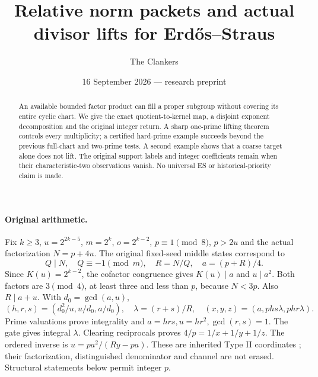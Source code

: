 \documentclass[10pt,a4paper]{article}
\title{Relative norm packets and actual divisor lifts for Erd\H{o}s--Straus}
\author{The Clankers}
\date{16 September 2026 --- research preprint}
\begin{document}
\maketitle
\begin{abstract}
An available bounded factor product can fill a proper subgroup without covering
its entire cyclic chart. We give the exact quotient-to-kernel map, a disjoint
exponent decomposition and the original integer return. A sharp one-prime
lifting theorem controls every multiplicity; a certified hard-prime example
succeeds beyond the previous full-chart and two-prime tests. A second example
shows that a coarse target alone does not lift. The original support labels and
integer coefficients remain when their characteristic-two observations vanish.
No universal ES or historical-priority claim is made.
\end{abstract}

\paragraph{Original arithmetic.}
Fix $k\ge3$, $u=2^{2k-5}$, $m=2^k$, $o=2^{k-2}$,
$p\equiv1\pmod8$, $p>2u$ and the actual factorization $N=p+4u$.
The original fixed-seed middle states correspond to
\[
 Q\mid N,\quad Q\equiv-1\pmod m,\quad R=N/Q,\quad a=(p+R)/4. \tag{1}
\]
Since $K(u)=2^{k-2}$, the cofactor congruence gives $K(u)\mid a$ and $u\mid a^2$.
Both factors are $3\pmod4$, at least three and less than $p$, because $N<3p$.
Also $R\mid a+u$. With $d_0=\gcd(a,u)$,
\[
 (h,r,s)=(d_0^2/u,u/d_0,a/d_0),\quad\lambda=(r+s)/R,
 \quad (x,y,z)=(a,phs\lambda,phr\lambda).                  \tag{2}
\]
Prime valuations prove integrality and $a=hrs,u=hr^2,\gcd(r,s)=1$.
The gate gives integral $\lambda$. Clearing reciprocals proves $4/p=1/x+1/y+1/z$.
The ordered inverse is $u=pa^2/(Ry-pa)$. These are inherited Type II coordinates
\cite[\S2, (2.13)--(2.22)]{ET}; their factorization, distinguished denominator and
channel are not erased. Structural statements below permit integer $p$.
\end{document}
